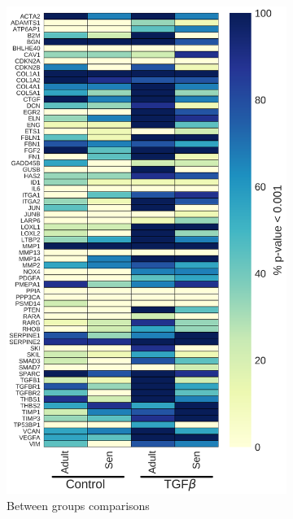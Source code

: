 \documentclass[alpha-refs]{wiley-article}
\begin{document}
\begin{figure}
	\centering%
	\begin{subfigure}{0.45\linewidth}
		\includegraphics[height=0.7\textheight, width=\linewidth]{LIMMA09_2018/SavedObjects/pval_less_than_0_001/between_heatmap0_001}
		\caption{Between groups comparisons}
		\label{fig:between:heatmap}
	\end{subfigure}
	\begin{subfigure}{0.45\linewidth}

\end{subfigure}
\end{figure}
\end{document}

